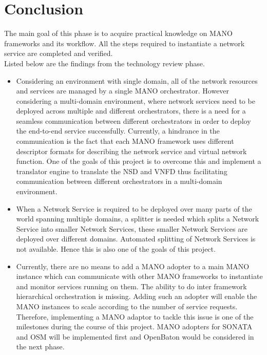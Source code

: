 \chapter{Conclusion}
\label{ch:Conclusion}

The main goal of this phase is to acquire practical knowledge on MANO frameworks and its workflow. All the steps required to instantiate a network service are completed and verified.\\

Listed below are the findings from the technology review phase.

\begin{itemize}
	
	\item Considering an environment with single domain, all of the network resources and services are managed by a single MANO orchestrator. However considering a multi-domain
	environment, where network services need to be deployed across multiple and different orchestrators, there is a need for a seamless communication between different orchestrators in order to deploy the end-to-end service successfully. Currently, a hindrance in the communication is the fact that each MANO framework uses different descriptor formats for describing the network service and virtual network function. One of the goals of this project is to overcome this and  implement a translator engine to translate the NSD and VNFD thus facilitating communication between different orchestrators in a multi-domain environment.
	
	\item When a Network Service is required to be deployed over many parts of the world spanning multiple domains, a splitter is needed which splits a Network Service into smaller Network Services, these smaller Network Services are deployed over different domains. Automated splitting of Network Services is not available. Hence this is also one of the goals of this project. 
	 
	\item Currently, there are no means to add a MANO adopter to a main MANO instance which can communicate with other MANO frameworks to instantiate and monitor services running on them. The ability to do inter framework hierarchical orchestration is missing. Adding such an adopter will enable the MANO instances to scale according to the number of service requests. Therefore, implementing a MANO adaptor to tackle this issue is one of the milestones during the course of this project. MANO adopters for SONATA and OSM will be implemented first and OpenBaton would be considered in the next phase.
	 
\end{itemize}





